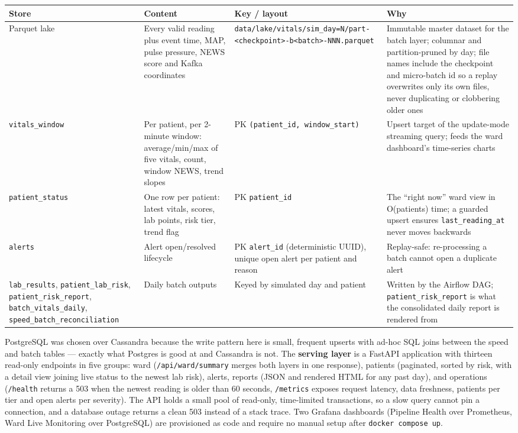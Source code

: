 \documentclass[11pt,a4paper]{article}
\newcommand{\code}[1]{\texttt{\small #1}}
\begin{document}
\begin{longtable}{@{}L{2.3cm}L{4.8cm}L{3.2cm}L{4.4cm}@{}}
\toprule
\textbf{Store} & \textbf{Content} & \textbf{Key / layout} & \textbf{Why} \\
\midrule
\endhead
Parquet lake & Every valid reading plus event time, MAP, pulse pressure, NEWS score and Kafka coordinates &
\code{data/lake/vitals/sim\_day=N/part-<checkpoint>-b<batch>-NNN.parquet} &
Immutable master dataset for the batch layer; columnar and partition-pruned by day; file names include the checkpoint and micro-batch id so a replay overwrites only its own files, never duplicating or clobbering older ones \\
\code{vitals\_window} & Per patient, per 2-minute window: average/min/max of five vitals, count, window NEWS, trend slopes &
PK \code{(patient\_id, window\_start)} &
Upsert target of the update-mode streaming query; feeds the ward dashboard's time-series charts \\
\code{patient\_status} & One row per patient: latest vitals, scores, lab points, risk tier, trend flag &
PK \code{patient\_id} &
The ``right now'' ward view in O(patients) time; a guarded upsert ensures \code{last\_reading\_at} never moves backwards \\
\code{alerts} & Alert open/resolved lifecycle &
PK \code{alert\_id} (deterministic UUID), unique open alert per patient and reason &
Replay-safe: re-processing a batch cannot open a duplicate alert \\
\code{lab\_results}, \code{patient\_lab\_risk}, \code{patient\_risk\_report}, \code{batch\_vitals\_daily}, \code{speed\_batch\_reconciliation} & Daily batch outputs &
Keyed by simulated day and patient &
Written by the Airflow DAG; \code{patient\_risk\_report} is what the consolidated daily report is rendered from \\
\bottomrule
\end{longtable}

PostgreSQL was chosen over Cassandra because the write pattern here is small, frequent upserts with
ad-hoc SQL joins between the speed and batch tables --- exactly what Postgres is good at and
Cassandra is not. The \textbf{serving layer} is a FastAPI application with thirteen read-only
endpoints in five groups: ward (\code{/api/ward/summary} merges both layers in one response),
patients (paginated, sorted by risk, with a detail view joining live status to the newest lab risk),
alerts, reports (JSON and rendered HTML for any past day), and operations (\code{/health} returns a
503 when the newest reading is older than 60 seconds, \code{/metrics} exposes request latency, data
freshness, patients per tier and open alerts per severity). The API holds a small pool of read-only,
time-limited transactions, so a slow query cannot pin a connection, and a database outage returns a
clean 503 instead of a stack trace. Two Grafana dashboards (Pipeline Health over Prometheus, Ward
Live Monitoring over PostgreSQL) are provisioned as code and require no manual setup after
\code{docker compose up}.
\end{document}
